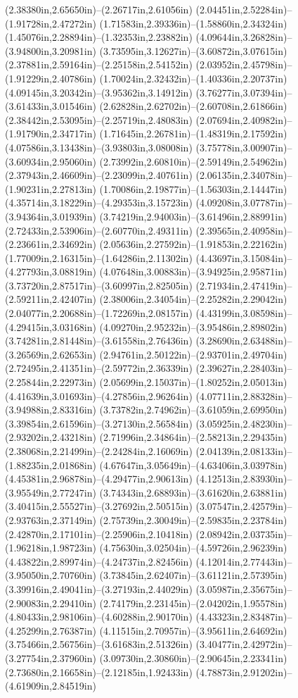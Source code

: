 (2.38380in,2.65650in)--(2.26717in,2.61056in) (2.04451in,2.52284in)--(1.91728in,2.47272in) (1.71583in,2.39336in)--(1.58860in,2.34324in) (1.45076in,2.28894in)--(1.32353in,2.23882in) (4.09644in,3.26828in)--(3.94800in,3.20981in) (3.73595in,3.12627in)--(3.60872in,3.07615in) (2.37881in,2.59164in)--(2.25158in,2.54152in) (2.03952in,2.45798in)--(1.91229in,2.40786in) (1.70024in,2.32432in)--(1.40336in,2.20737in) (4.09145in,3.20342in)--(3.95362in,3.14912in) (3.76277in,3.07394in)--(3.61433in,3.01546in) (2.62828in,2.62702in)--(2.60708in,2.61866in) (2.38442in,2.53095in)--(2.25719in,2.48083in) (2.07694in,2.40982in)--(1.91790in,2.34717in) (1.71645in,2.26781in)--(1.48319in,2.17592in) (4.07586in,3.13438in)--(3.93803in,3.08008in) (3.75778in,3.00907in)--(3.60934in,2.95060in) (2.73992in,2.60810in)--(2.59149in,2.54962in) (2.37943in,2.46609in)--(2.23099in,2.40761in) (2.06135in,2.34078in)--(1.90231in,2.27813in) (1.70086in,2.19877in)--(1.56303in,2.14447in) (4.35714in,3.18229in)--(4.29353in,3.15723in) (4.09208in,3.07787in)--(3.94364in,3.01939in) (3.74219in,2.94003in)--(3.61496in,2.88991in) (2.72433in,2.53906in)--(2.60770in,2.49311in) (2.39565in,2.40958in)--(2.23661in,2.34692in) (2.05636in,2.27592in)--(1.91853in,2.22162in) (1.77009in,2.16315in)--(1.64286in,2.11302in) (4.43697in,3.15084in)--(4.27793in,3.08819in) (4.07648in,3.00883in)--(3.94925in,2.95871in) (3.73720in,2.87517in)--(3.60997in,2.82505in) (2.71934in,2.47419in)--(2.59211in,2.42407in) (2.38006in,2.34054in)--(2.25282in,2.29042in) (2.04077in,2.20688in)--(1.72269in,2.08157in) (4.43199in,3.08598in)--(4.29415in,3.03168in) (4.09270in,2.95232in)--(3.95486in,2.89802in) (3.74281in,2.81448in)--(3.61558in,2.76436in) (3.28690in,2.63488in)--(3.26569in,2.62653in) (2.94761in,2.50122in)--(2.93701in,2.49704in) (2.72495in,2.41351in)--(2.59772in,2.36339in) (2.39627in,2.28403in)--(2.25844in,2.22973in) (2.05699in,2.15037in)--(1.80252in,2.05013in) (4.41639in,3.01693in)--(4.27856in,2.96264in) (4.07711in,2.88328in)--(3.94988in,2.83316in) (3.73782in,2.74962in)--(3.61059in,2.69950in) (3.39854in,2.61596in)--(3.27130in,2.56584in) (3.05925in,2.48230in)--(2.93202in,2.43218in) (2.71996in,2.34864in)--(2.58213in,2.29435in) (2.38068in,2.21499in)--(2.24284in,2.16069in) (2.04139in,2.08133in)--(1.88235in,2.01868in) (4.67647in,3.05649in)--(4.63406in,3.03978in) (4.45381in,2.96878in)--(4.29477in,2.90613in) (4.12513in,2.83930in)--(3.95549in,2.77247in) (3.74343in,2.68893in)--(3.61620in,2.63881in) (3.40415in,2.55527in)--(3.27692in,2.50515in) (3.07547in,2.42579in)--(2.93763in,2.37149in) (2.75739in,2.30049in)--(2.59835in,2.23784in) (2.42870in,2.17101in)--(2.25906in,2.10418in) (2.08942in,2.03735in)--(1.96218in,1.98723in) (4.75630in,3.02504in)--(4.59726in,2.96239in) (4.43822in,2.89974in)--(4.24737in,2.82456in) (4.12014in,2.77443in)--(3.95050in,2.70760in) (3.73845in,2.62407in)--(3.61121in,2.57395in) (3.39916in,2.49041in)--(3.27193in,2.44029in) (3.05987in,2.35675in)--(2.90083in,2.29410in) (2.74179in,2.23145in)--(2.04202in,1.95578in) (4.80433in,2.98106in)--(4.60288in,2.90170in) (4.43323in,2.83487in)--(4.25299in,2.76387in) (4.11515in,2.70957in)--(3.95611in,2.64692in) (3.75466in,2.56756in)--(3.61683in,2.51326in) (3.40477in,2.42972in)--(3.27754in,2.37960in) (3.09730in,2.30860in)--(2.90645in,2.23341in) (2.73680in,2.16658in)--(2.12185in,1.92433in) (4.78873in,2.91202in)--(4.61909in,2.84519in) 